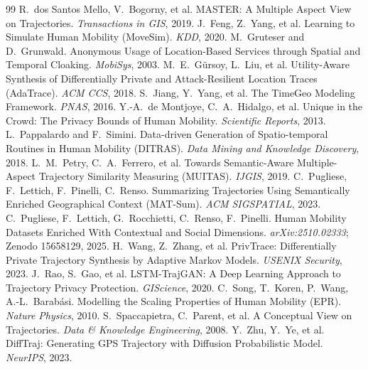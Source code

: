 \documentclass[sigconf,nonacm]{acmart}
\begin{document}
\begin{thebibliography}{99}
 R.~dos Santos Mello, V.~Bogorny, et al. MASTER: A Multiple Aspect View on Trajectories. \emph{Transactions in GIS}, 2019.
 J.~Feng, Z.~Yang, et al. Learning to Simulate Human Mobility (MoveSim). \emph{KDD}, 2020.
 M.~Gruteser and D.~Grunwald. Anonymous Usage of Location-Based Services through Spatial and Temporal Cloaking. \emph{MobiSys}, 2003.
 M.~E.~G\"ursoy, L.~Liu, et al. Utility-Aware Synthesis of Differentially Private and Attack-Resilient Location Traces (AdaTrace). \emph{ACM CCS}, 2018.
 S.~Jiang, Y.~Yang, et al. The TimeGeo Modeling Framework. \emph{PNAS}, 2016.
 Y.-A.~de Montjoye, C.~A.~Hidalgo, et al. Unique in the Crowd: The Privacy Bounds of Human Mobility. \emph{Scientific Reports}, 2013.
 L.~Pappalardo and F.~Simini. Data-driven Generation of Spatio-temporal Routines in Human Mobility (DITRAS). \emph{Data Mining and Knowledge Discovery}, 2018.
 L.~M.~Petry, C.~A.~Ferrero, et al. Towards Semantic-Aware Multiple-Aspect Trajectory Similarity Measuring (MUITAS). \emph{IJGIS}, 2019.
 C.~Pugliese, F.~Lettich, F.~Pinelli, C.~Renso. Summarizing Trajectories Using Semantically Enriched Geographical Context (MAT-Sum). \emph{ACM SIGSPATIAL}, 2023.
 C.~Pugliese, F.~Lettich, G.~Rocchietti, C.~Renso, F.~Pinelli. Human Mobility Datasets Enriched With Contextual and Social Dimensions. \emph{arXiv:2510.02333}; Zenodo 15658129, 2025.
 H.~Wang, Z.~Zhang, et al. PrivTrace: Differentially Private Trajectory Synthesis by Adaptive Markov Models. \emph{USENIX Security}, 2023.
 J.~Rao, S.~Gao, et al. LSTM-TrajGAN: A Deep Learning Approach to Trajectory Privacy Protection. \emph{GIScience}, 2020.
 C.~Song, T.~Koren, P.~Wang, A.-L.~Barab\'asi. Modelling the Scaling Properties of Human Mobility (EPR). \emph{Nature Physics}, 2010.
 S.~Spaccapietra, C.~Parent, et al. A Conceptual View on Trajectories. \emph{Data \& Knowledge Engineering}, 2008.
 Y.~Zhu, Y.~Ye, et al. DiffTraj: Generating GPS Trajectory with Diffusion Probabilistic Model. \emph{NeurIPS}, 2023.
\end{thebibliography}
\end{document}
